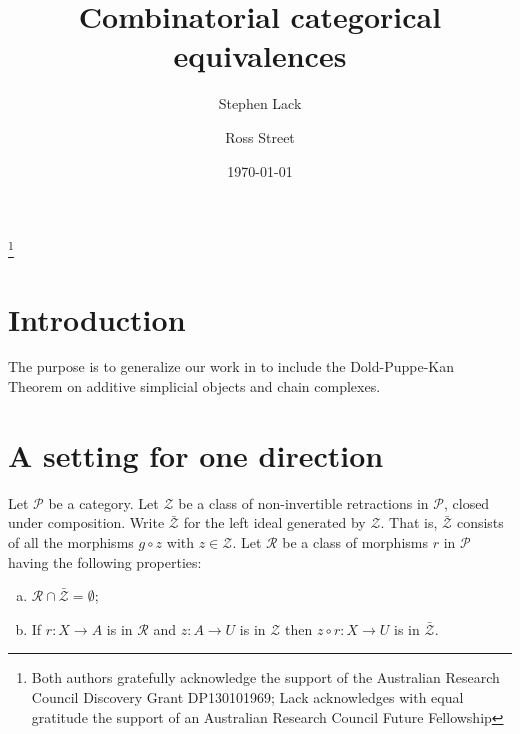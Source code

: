 \documentclass[a4paper,12pt,reqno]{amsart}
\theoremstyle{definition}
\theoremstyle{fact}
\theoremstyle{genquest}
\theoremstyle{step}
\def\CP{{\mathscr P}}
\def\CR{{\mathscr R}}
\def\CZ{{\mathscr Z}}
\begin{document}
\title{Combinatorial categorical equivalences}

\author{Stephen Lack}
\address{Department of Mathematics, Macquarie University, NSW 2109, Australia}

\author{Ross Street}
\address{Department of Mathematics, Macquarie University, NSW 2109, Australia}

\thanks{Both authors gratefully acknowledge the support of the Australian Research Council Discovery Grant DP130101969; Lack acknowledges with equal gratitude the support of an Australian Research Council Future Fellowship}

\date{\today}
\maketitle

\tableofcontents

\section{Introduction}

The purpose is to generalize our work in \cite{PMSE} to include the 
Dold-Puppe-Kan Theorem \cite{Dold, DoldPuppe, Kan} 
on additive simplicial objects and chain complexes. 

\section{A setting for one direction}\label{settingone}

Let $\CP$ be a category. Let $\CZ$ be a class of non-invertible retractions
in $\CP$, closed under composition. Write $\bar{\CZ}$ for the left
ideal generated by $\CZ$. That is, $\bar{\CZ}$ consists of all the morphisms $g\circ z$ with $z\in \CZ$.  
Let $\CR$ be a class of morphisms $r$ in $\CP$ having the following properties: 
\begin{enumerate}[(a)]
\item $\CR \cap \bar{\CZ} = \emptyset$;
\item If $r : X \rightarrow A$ is in $\CR$ and $z:A\rightarrow U$ is in $\CZ$ then $z\circ r : X \rightarrow U$ is in $\bar{\CZ}$.
\end{enumerate}
\end{document}
